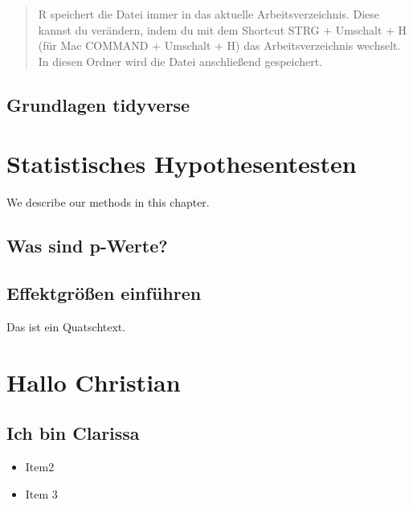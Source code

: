 \documentclass[
]{book}
\providecommand{\tightlist}{%
  \setlength{\itemsep}{0pt}\setlength{\parskip}{0pt}}
\begin{document}
\begin{quote}
R speichert die Datei immer in das aktuelle Arbeitsverzeichnis. Diese kannst du verändern, indem du mit dem Shortcut STRG + Umschalt + H (für Mac COMMAND + Umschalt + H) das Arbeitsverzeichnis wechselt. In diesen Ordner wird die Datei anschließend gespeichert.
\end{quote}

\hypertarget{grundlagen-tidyverse}{%
\section{Grundlagen tidyverse}\label{grundlagen-tidyverse}}

\hypertarget{statistisches-hypothesentesten}{%
\chapter{Statistisches Hypothesentesten}\label{statistisches-hypothesentesten}}

We describe our methods in this chapter.

\hypertarget{was-sind-p-werte}{%
\section{Was sind p-Werte?}\label{was-sind-p-werte}}

\hypertarget{effektgruxf6uxdfen-einfuxfchren}{%
\section{Effektgrößen einführen}\label{effektgruxf6uxdfen-einfuxfchren}}

Das ist ein Quatschtext.

\hypertarget{hallo-christian}{%
\chapter{Hallo Christian}\label{hallo-christian}}

\hypertarget{ich-bin-clarissa}{%
\section{Ich bin Clarissa}\label{ich-bin-clarissa}}

\begin{itemize}
\tightlist
\item
  Item2
\item
  Item 3
\end{itemize}
\end{document}
